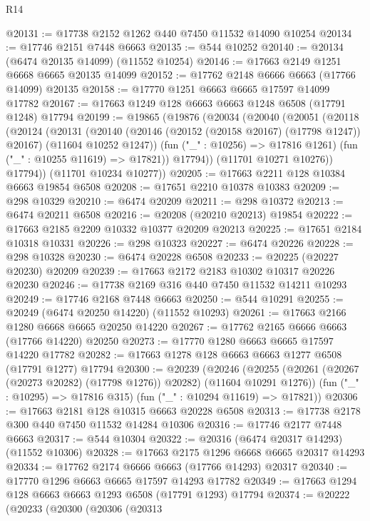 \begin{lexlean}{R14}
\begin{coremodule}
{{{{{{{{{{{{{{{{{{{{{{{{{{{{{{{{{{{{{{{{{{{{{{{{{{{{{{{{{{{{{{{{{{{{{{{{{{{{{{{{{{@20131 := @17738 @2152 @1262 @440 @7450 @11532 @14090 @10254
@20134 := @17746 @2151 @7448 @6663
@20135 := @544 @10252
@20140 := @20134 (@6474 @20135 @14099) (@11552 @10254)
@20146 := @17663 @2149 @1251 @6668 @6665 @20135 @14099
@20152 := @17762 @2148 @6666 @6663 (@17766 @14099) @20135
@20158 := @17770 @1251 @6663 @6665 @17597 @14099 @17782
@20167 := @17663 @1249 @128 @6663 @6663 @1248 @6508 (@17791 @1248) @17794
@20199 := @19865
    (@19876
      (@20034
        (@20040
          (@20051
            (@20118
              (@20124
                (@20131
                  (@20140
                    (@20146 (@20152 (@20158 @20167) (@17798 @1247)) @20167)
                    (@11604 @10252 @1247))
                  (fun ("_" : @10256) => @17816 @1261)
                  (fun ("_" : @10255 @11619) => @17821))
                @17794))
            (@11701 @10271 @10276))
          @17794))
      (@11701 @10234 @10277))
@20205 := @17663 @2211 @128 @10384 @6663 @19854 @6508
@20208 := @17651 @2210 @10378 @10383
@20209 := @298 @10329
@20210 := @6474 @20209
@20211 := @298 @10372
@20213 := @6474 @20211 @6508
@20216 := @20208 (@20210 @20213) @19854
@20222 := @17663 @2185 @2209 @10332 @10377 @20209 @20213
@20225 := @17651 @2184 @10318 @10331
@20226 := @298 @10323
@20227 := @6474 @20226
@20228 := @298 @10328
@20230 := @6474 @20228 @6508
@20233 := @20225 (@20227 @20230) @20209
@20239 := @17663 @2172 @2183 @10302 @10317 @20226 @20230
@20246 := @17738 @2169 @316 @440 @7450 @11532 @14211 @10293
@20249 := @17746 @2168 @7448 @6663
@20250 := @544 @10291
@20255 := @20249 (@6474 @20250 @14220) (@11552 @10293)
@20261 := @17663 @2166 @1280 @6668 @6665 @20250 @14220
@20267 := @17762 @2165 @6666 @6663 (@17766 @14220) @20250
@20273 := @17770 @1280 @6663 @6665 @17597 @14220 @17782
@20282 := @17663 @1278 @128 @6663 @6663 @1277 @6508 (@17791 @1277) @17794
@20300 := @20239
    (@20246
      (@20255 (@20261 (@20267 (@20273 @20282) (@17798 @1276)) @20282) (@11604 @10291 @1276))
      (fun ("_" : @10295) => @17816 @315)
      (fun ("_" : @10294 @11619) => @17821))
@20306 := @17663 @2181 @128 @10315 @6663 @20228 @6508
@20313 := @17738 @2178 @300 @440 @7450 @11532 @14284 @10306
@20316 := @17746 @2177 @7448 @6663
@20317 := @544 @10304
@20322 := @20316 (@6474 @20317 @14293) (@11552 @10306)
@20328 := @17663 @2175 @1296 @6668 @6665 @20317 @14293
@20334 := @17762 @2174 @6666 @6663 (@17766 @14293) @20317
@20340 := @17770 @1296 @6663 @6665 @17597 @14293 @17782
@20349 := @17663 @1294 @128 @6663 @6663 @1293 @6508 (@17791 @1293) @17794
@20374 := @20222
    (@20233
      (@20300
        (@20306
          (@20313
}}}}}}}}}}}}}}}}}}}}}}}}}}}}}}}}}}}}}}}}}}}}}}}}}}}}}}}}}}}}}}}}}}}}}}}}}}}}}}}}}}
\end{coremodule}
\end{lexlean}
